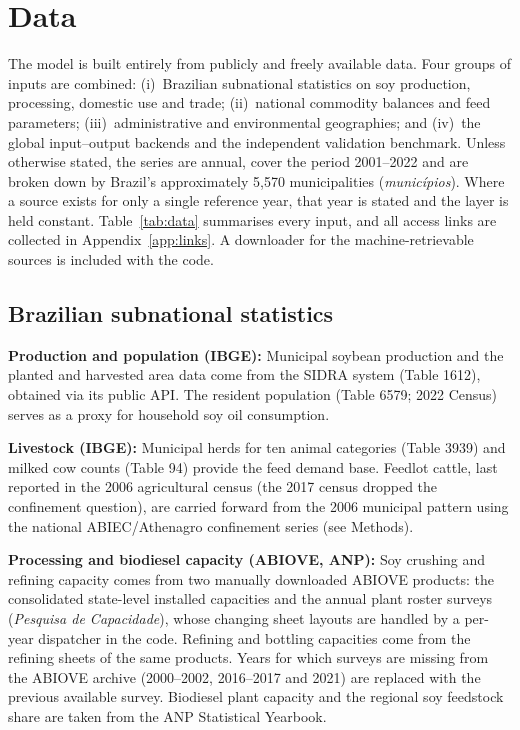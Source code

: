 \section{Data}\label{sec:data}

The model is built entirely from publicly and freely available data. Four
groups of inputs are combined: (i)~Brazilian subnational statistics on soy
production, processing, domestic use and trade; (ii)~national commodity
balances and feed parameters; (iii)~administrative and environmental
geographies; and (iv)~the global input--output backends and the independent
validation benchmark. Unless otherwise stated, the series are annual, cover the period 2001–2022 and are broken down by Brazil's approximately 5,570 municipalities
(\emph{munic\'ipios}). Where a source exists for only a single reference
year, that year is stated and the layer is held constant.
Table~\ref{tab:data} summarises every input, and all access links are collected
in Appendix~\ref{app:links}. A downloader for the machine-retrievable
sources is included with the code.

\subsection{Brazilian subnational statistics}\label{subsec:brazil}

\textbf{Production and population (IBGE):} Municipal soybean production and the planted and harvested area data come from the SIDRA system (Table 1612), obtained via its public API. The resident population (Table 6579; 2022 Census) serves as a proxy for household soy oil consumption.

\textbf{Livestock (IBGE):} Municipal herds for ten animal categories (Table 3939) and milked cow counts (Table 94) provide the feed demand base. Feedlot cattle, last reported in the 2006 agricultural census (the 2017 census dropped the confinement question), are carried forward from the 2006 municipal pattern using the national ABIEC/Athenagro confinement series (see Methods).

\textbf{Processing and biodiesel capacity (ABIOVE, ANP):} Soy crushing and
refining capacity comes from two manually downloaded ABIOVE products: the
consolidated state-level installed capacities and the annual plant roster
surveys (\emph{Pesquisa de Capacidade}), whose changing sheet layouts are
handled by a per-year dispatcher in the code. Refining and bottling
capacities come from the refining sheets of the same products. Years for which surveys are missing from the ABIOVE archive (2000–2002, 2016–2017 and 2021) are replaced with the previous available survey. Biodiesel plant capacity and the regional soy feedstock share are taken from the ANP Statistical Yearbook.

